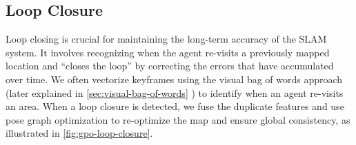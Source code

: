 \subsection{Loop Closure}
\label{sec:visual-slam-loop-closure}
Loop closing is crucial for maintaining the long-term accuracy of the SLAM system. It involves recognizing when the agent re-visits a previously mapped location and ``closes the loop'' by correcting the errors that have accumulated over time. We often vectorize keyframes using the visual bag of words approach (later explained in \autoref{sec:visual-bag-of-words} ) to identify when an agent re-visits an area. When a loop closure is detected, we fuse the duplicate features and use pose graph optimization to re-optimize the map and ensure global consistency, as illustrated in \autoref{fig:gpo-loop-closure}.

